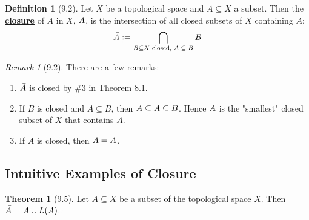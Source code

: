 \documentclass{article}
\newcommand{\R}{\ensuremath{\mathbb{R}}}
\newcommand{\N}{\ensuremath{\mathbb{N}}}
\newcommand{\closure}[1]{\ensuremath{\Bar{#1}}}
\newcommand{\oBall}[3][\empty]{\ensuremath{B^{#1}_{#2}(#3)}}
\newcommand{\define}[1]{\textbf{\underline{#1}}}
\newcommand{\ts}{\text topological space}
\newcommand{\tp}{\ensuremath{\mathcal{T}}}
\newcommand{\tpdisc}{\ensuremath{\tp_\text{disc}}}
\newcommand{\tptriv}{\ensuremath{\tp_\text{triv}}}
\newcommand{\union}{\cup}
\newcommand{\Inter}{\bigcap}
\renewcommand{\Subset}{\subseteq}
\theoremstyle{definition}
\newtheorem*{definition}{Definition}
\newtheorem*{theorem}{Theorem}
\theoremstyle{remark}
\newtheorem*{remark}{Remark}
\begin{document}
    \begin{definition}[9.2]
        Let $X$ be a \ts{} and $A \Subset X$ a subset. Then the \define{closure} of $A$ in $X$, $\closure{A}$, is the intersection of all closed subsets of $X$ containing $A$:
            \[\closure{A} := \Inter_{B \Subset \text{$X$ closed, $A \Subset B$}}B\]
    \end{definition}
    
    \begin{remark}[9.2] There are a few remarks:
        \begin{enumerate}
            \item \closure{A} is closed by \#3 in Theorem 8.1.
            \item If $B$ is closed and $A \Subset B$, then $A \Subset \closure{A} \Subset B$. Hence $\closure{A}$ is the "smallest" closed subset of $X$ that contains $A$.
            \item If $A$ is closed, then $\closure{A} = A$.
        \end{enumerate}
    \end{remark}

    \subsection*{Intuitive Examples of Closure}
        
        \begin{theorem}[9.5]
            Let $A \Subset X$ be a subset of the \ts{} $X$. Then $\closure{A} = A \union L(A)$.
        \end{theorem}
\end{document}
